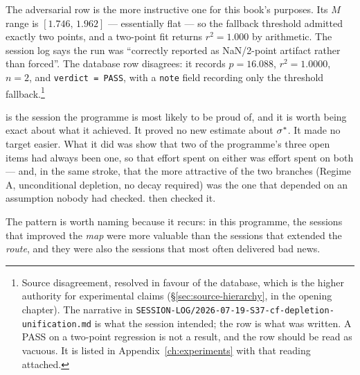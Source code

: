 The adversarial row is the more instructive one for this book's purposes. Its
\(M\) range is \([1.746,\,1.962]\) --- essentially flat --- so the fallback
threshold admitted exactly two points, and a two-point fit returns
\(r^2=1.000\) by arithmetic. The session log says the run was ``correctly
reported as NaN/2-point artifact rather than forced''. The database row
disagrees: it records \(p=16.088\), \(r^2=1.0000\), \(n=2\), and
\texttt{verdict = PASS}, with a \texttt{note} field recording only the
threshold fallback.\footnote{Source disagreement, resolved in favour of the
database, which is the higher authority for experimental claims
(\S\ref{sec:source-hierarchy}, in the opening chapter). The narrative in
\texttt{SESSION-LOG/2026-07-19-S37-cf-depletion-unification.md} is what the
session intended; the row is what was written. A \textsf{PASS} on a two-point
regression is not a result, and the row should be read as vacuous. It is
listed in Appendix~\ref{ch:experiments} with that reading attached.}

\begin{obsv}
\label{obs:unification-value}
 is the session the programme is most likely to be proud of, and it is
worth being exact about what it achieved. It proved no new estimate about
\(\sigma^{*}\). It made no target easier. What it did was show that two of the
programme's three open items had always been one, so that effort spent on
either was effort spent on both --- and, in the same stroke, that the more
attractive of the two branches (Regime A, unconditional depletion, no decay
required) was the one that depended on an assumption nobody had checked.
 then checked it.

\smallskip
The pattern is worth naming because it recurs: in this programme, the sessions
that improved the \emph{map} were more valuable than the sessions that
extended the \emph{route}, and they were also the sessions that most often
delivered bad news.
\end{obsv}

